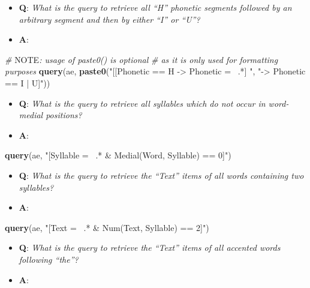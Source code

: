 \documentclass[]{book}
\newenvironment{Shaded}{\begin{snugshade}}{\end{snugshade}}
\newcommand{\AlertTok}[1]{\textcolor[rgb]{0.94,0.16,0.16}{#1}}
\newcommand{\CommentTok}[1]{\textcolor[rgb]{0.56,0.35,0.01}{\textit{#1}}}
\newcommand{\KeywordTok}[1]{\textcolor[rgb]{0.13,0.29,0.53}{\textbf{#1}}}
\newcommand{\NormalTok}[1]{#1}
\newcommand{\StringTok}[1]{\textcolor[rgb]{0.31,0.60,0.02}{#1}}
\providecommand{\tightlist}{%
  \setlength{\itemsep}{0pt}\setlength{\parskip}{0pt}}
\theoremstyle{definition}
\theoremstyle{definition}
\theoremstyle{definition}
\theoremstyle{remark}
\begin{document}
\begin{itemize}
\tightlist
\item
  \textbf{Q}: \emph{What is the query to retrieve all ``H'' phonetic
  segments followed by an arbitrary segment and then by either ``I'' or
  ``U''?}
\item
  \textbf{A}:
\end{itemize}

\begin{Shaded}
\begin{Highlighting}[]
\CommentTok{# }\AlertTok{NOTE}\CommentTok{: usage of paste0() is optional}
\CommentTok{# as it is only used for formatting purposes}
\KeywordTok{query}\NormalTok{(ae, }\KeywordTok{paste0}\NormalTok{(}\StringTok{"[[Phonetic == H -> Phonetic =~ .*] "}\NormalTok{,}
                 \StringTok{"-> Phonetic == I | U]"}\NormalTok{))}
\end{Highlighting}
\end{Shaded}

\begin{itemize}
\tightlist
\item
  \textbf{Q}: \emph{What is the query to retrieve all syllables which do
  not occur in word-medial positions?}
\item
  \textbf{A}:
\end{itemize}

\begin{Shaded}
\begin{Highlighting}[]
\KeywordTok{query}\NormalTok{(ae, }\StringTok{"[Syllable =~ .* & Medial(Word, Syllable) == 0]"}\NormalTok{)}
\end{Highlighting}
\end{Shaded}

\begin{itemize}
\tightlist
\item
  \textbf{Q}: \emph{What is the query to retrieve the ``Text'' items of
  all words containing two syllables?}
\item
  \textbf{A}:
\end{itemize}

\begin{Shaded}
\begin{Highlighting}[]
\KeywordTok{query}\NormalTok{(ae, }\StringTok{"[Text =~ .* & Num(Text, Syllable) == 2]"}\NormalTok{)}
\end{Highlighting}
\end{Shaded}

\begin{itemize}
\tightlist
\item
  \textbf{Q}: \emph{What is the query to retrieve the ``Text'' items of
  all accented words following ``the''?}
\item
  \textbf{A}:
\end{itemize}
\end{document}
